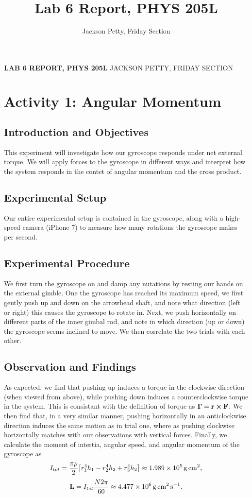 \documentclass[12pt]{amsart}
\title{Lab 6 Report, PHYS 205L}
\author{Jackson Petty, Friday Section}
\begin{document}
		\noindent\textbf{LAB 6 REPORT, PHYS 205L} \hfill {\small JACKSON PETTY, FRIDAY SECTION} \\
		\section*{Activity 1: Angular Momentum}
			\subsection*{Introduction and Objectives}
			This experiment will investigate how our gyroscope responds under net external torque. We will apply forces to the gyroscope in different ways and interpret how the system responds in the contet of angular momentum and the cross product.
			\subsection*{Experimental Setup}
			Our entire experimental setup is contained in the gyroscope, along with a high-speed camera (iPhone 7) to measure how many rotations the gyroscope makes per second.
			\subsection*{Experimental Procedure}
			We first turn the gyroscope on and damp any nutations by resting our hands on the external gimble. One the gyroscope has reached its maximum speed, we first gently push up and down on the arrowhead shaft, and note what direction (left or right) this causes the gyroscope to rotate in. Next, we push horizontally on different parts of the inner gimbal rod, and note in which direction (up or down) the gyroscope seems inclined to move. We then correlate the two trials with each other.
			\subsection*{Observation and Findings}
			As expected, we find that pushing up induces a torque in the clockwise direction (when viewed from above), while pushing down induces a counterclockwise torque in the system. This is consistant with the definition of torque as $\vb*{\Gamma} = \vb{r} \cross \vb{F}$. We then find that, in a very similar manner, pushing horizontally in an anticlockwise direction induces the same motion as in trial one, where as pushing clockwise horizontally matches with our observations with vertical forces.
			Finally, we calculate the moment of intertia, angular speed, and angular momentum of the gyroscope as 
			\[ I_{tot} = \frac{\pi\rho}{2}\qty[r_1^4h_1 - r_2^4h_2 + r_3^4h_2] \approx \SI{1,989e5}{\gram\centi\meter\squared}, \]
			\[ \vb{L} = I_{tot}\frac{N2\pi}{60} \approx \SI{4.477e6}{\gram\centi\meter\squared\per\second}. \]
\end{document}
